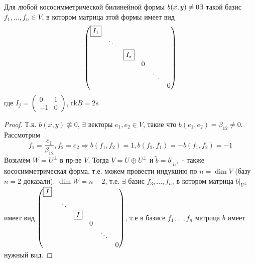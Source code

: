 \begin{theorem}
    Для любой кососимметрической билинейной формы $b(x,y) \not \equiv 0 \\ \exists$ такой базис $f_1,...,f_n \in V$, в котором матрица этой формы имеет вид
    $$\begin{pmatrix}
    \text{\fbox{$I_1$}}\\
    \null & \ddots\\
    \null & \null & \text{\fbox{$I_s$}}\\
    \null & \null & \null & 0\\
    \null & \null & \null & \null & \ddots\\
    \null & \null & \null & \null & \null & 0
    \end{pmatrix}$$ 
    где $I_j = \begin{pmatrix} 0&1 \\ -1&0 \end{pmatrix}$, $\text{rk} B = 2s$
\end{theorem}
\begin{proof}
    Т.к. $b(x,y) \not \equiv 0$, $\exists$ векторы $e_1, e_2 \in V$, такие что $b(e_1, e_2) = \beta_{12} \neq 0$. Рассмотрим
    $$f_1 = \frac{e_1}{\beta_{12}}, f_2 = e_2 \Rightarrow b(f_1,f_2) = 1, b(f_2,f_1) = -b(f_1,f_2) = -1$$
    Возьмём $W = U^{\perp}$ в пр-ве $V$. Тогда $V = U \oplus U^{\perp}$ и $\tilde{b} = b|_{U^{\perp}}$ - также кососимметрическая форма, т.е. можем провести индукцию по $n = \dim V$ (базу $n = 2$ доказали). $\dim W = n-2$, т.е. $\exists$ базис $f_3,...,f_n$, в котором матрица $b|_{U^{\perp}}$ имеет вид $\begin{pmatrix}
    \text{\fbox{$I$}}\\
    \null & \ddots\\
    \null & \null & \text{\fbox{$I$}}\\
    \null & \null & \null & 0\\
    \null & \null & \null & \null & \ddots\\
    \null & \null & \null & \null & \null & 0
    \end{pmatrix}$, т.е в базисе $f_1,...,f_n$ матрица $b$ имеет нужный вид.
\end{proof}